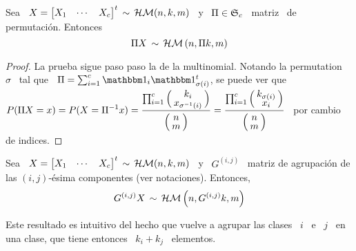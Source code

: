 \begin{lema}\label{Lem:MP:PermutacionHipergeomMulti}
%
  Sea  \ $X =  \begin{bmatrix} X_1  & \cdots  & X_c  \end{bmatrix}^t \,  \sim \,
  \mathcal{H}\mathcal{M}(n,k,m)$  \   y  \   $\Pi  \in  \mathfrak{S}_c$   \  matriz   \  de
  permutaci\'on. Entonces
  \[
  \Pi X \, \sim \, \mathcal{H}\mathcal{M}\left( n ,  \Pi k , m \right)
  \]
\end{lema}
%
\begin{proof}
  La  prueba sigue  paso paso  la de  la multinomial.  Notando la  permutation \
  $\sigma$ \  tal que \ $\Pi  = \sum_{i=1}^c \un_i  \un_{\sigma(i)}^t$, se puede
  ver   que  \  $\displaystyle   P(\Pi  X   =  x)   =  P(X   =  \Pi^{-1}   x)  =
  \frac{\prod_{i=1}^c       \bino{k_i}{x_{\sigma^{-1}(i)}}}{\bino{n}{m}}       =
  \frac{\prod_{i=1}^c \bino{k_{\sigma(i)}}{x_i}}{\bino{n}{m}} $  \ por cambio de
  indices.
\end{proof}
%
\begin{lema}\label{Lem:MP:StabAgregacionHipergeomMulti}
%
  Sea  \ $X =  \begin{bmatrix} X_1  & \cdots  & X_c  \end{bmatrix}^t \,  \sim \,
  \mathcal{H}\mathcal{M}(n,k,m)$ \ y \ $G^{(i,j)}$ \ matriz de agrupaci\'on de las $(i,j)$-\'esima
  componentes (ver notaciones). Entonces,
  \[
  G^{(i,j)} X \, \sim \, \mathcal{H}\mathcal{M}\left( n , G^{(i,j)} k , m \right)  
  \]
\end{lema}
%
Este resultado es intuitivo del hecho que  vuelve a agrupar las clases \ $i$ \ e
\ $j$ \ en una clase, que tiene entonces \ $k_i + k_j$ \ elementos.
%

